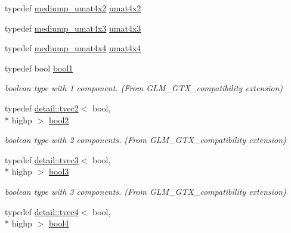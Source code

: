 \begin{DoxyCompactItemize}
\item 
typedef \hyperlink{group__gtc__matrix__integer_ga8ea45737e8bc9bfae2668968056b109f}{mediump\-\_\-umat4x2} \hyperlink{group__gtc__matrix__integer_ga13e8392218e9b6e1b7f194a21b5c88bf}{umat4x2}
\item 
typedef \hyperlink{group__gtc__matrix__integer_gaebe3b1b4b6030c096447e40fb00528f4}{mediump\-\_\-umat4x3} \hyperlink{group__gtc__matrix__integer_ga08373f5588a54da1a48e5e55c7d51004}{umat4x3}
\item 
typedef \hyperlink{group__gtc__matrix__integer_ga24b1c76fefa58f810e24cafe0ea6a6a0}{mediump\-\_\-umat4x4} \hyperlink{group__gtc__matrix__integer_gae0931b79e808fb0983848778a60eb548}{umat4x4}
\item 
\hypertarget{group__gtx__compatibility_gab65f19f5170f95a2f06d6aa6482c9405}{typedef bool \hyperlink{group__gtx__compatibility_gab65f19f5170f95a2f06d6aa6482c9405}{bool1}}\label{group__gtx__compatibility_gab65f19f5170f95a2f06d6aa6482c9405}

\begin{DoxyCompactList}\small\item\em boolean type with 1 component. (From G\-L\-M\-\_\-\-G\-T\-X\-\_\-compatibility extension) \end{DoxyCompactList}\item 
\hypertarget{group__gtx__compatibility_gafede6e8549e9bb9da63f404022298d40}{typedef \hyperlink{structglm_1_1detail_1_1tvec2}{detail\-::tvec2}$<$ bool, \\*
highp $>$ \hyperlink{group__gtx__compatibility_gafede6e8549e9bb9da63f404022298d40}{bool2}}\label{group__gtx__compatibility_gafede6e8549e9bb9da63f404022298d40}

\begin{DoxyCompactList}\small\item\em boolean type with 2 components. (From G\-L\-M\-\_\-\-G\-T\-X\-\_\-compatibility extension) \end{DoxyCompactList}\item 
\hypertarget{group__gtx__compatibility_gad18ebb149851844fd704e138c4af9a44}{typedef \hyperlink{structglm_1_1detail_1_1tvec3}{detail\-::tvec3}$<$ bool, \\*
highp $>$ \hyperlink{group__gtx__compatibility_gad18ebb149851844fd704e138c4af9a44}{bool3}}\label{group__gtx__compatibility_gad18ebb149851844fd704e138c4af9a44}

\begin{DoxyCompactList}\small\item\em boolean type with 3 components. (From G\-L\-M\-\_\-\-G\-T\-X\-\_\-compatibility extension) \end{DoxyCompactList}\item 
\hypertarget{group__gtx__compatibility_ga6ef1f104d22f384c4d59f2b1ca1768a7}{typedef \hyperlink{structglm_1_1detail_1_1tvec4}{detail\-::tvec4}$<$ bool, \\*
highp $>$ \hyperlink{group__gtx__compatibility_ga6ef1f104d22f384c4d59f2b1ca1768a7}{bool4}}\label{group__gtx__compatibility_ga6ef1f104d22f384c4d59f2b1ca1768a7}


\end{DoxyCompactItemize}
